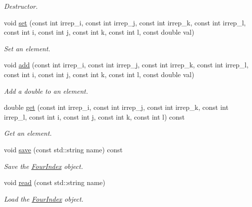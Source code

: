 \begin{DoxyCompactItemize}
\begin{DoxyCompactList}\small\item\em Destructor. \end{DoxyCompactList}\item 
void \hyperlink{classCheMPS2_1_1FourIndex_a8733c4fd0064bcd845786157f7d9b26f}{set} (const int irrep\-\_\-i, const int irrep\-\_\-j, const int irrep\-\_\-k, const int irrep\-\_\-l, const int i, const int j, const int k, const int l, const double val)
\begin{DoxyCompactList}\small\item\em Set an element. \end{DoxyCompactList}\item 
void \hyperlink{classCheMPS2_1_1FourIndex_a48e9e1b0939679da974e35c26281ba87}{add} (const int irrep\-\_\-i, const int irrep\-\_\-j, const int irrep\-\_\-k, const int irrep\-\_\-l, const int i, const int j, const int k, const int l, const double val)
\begin{DoxyCompactList}\small\item\em Add a double to an element. \end{DoxyCompactList}\item 
double \hyperlink{classCheMPS2_1_1FourIndex_ae93c264cbb81e7d39db778a129dc7ca1}{get} (const int irrep\-\_\-i, const int irrep\-\_\-j, const int irrep\-\_\-k, const int irrep\-\_\-l, const int i, const int j, const int k, const int l) const 
\begin{DoxyCompactList}\small\item\em Get an element. \end{DoxyCompactList}\item 
void \hyperlink{classCheMPS2_1_1FourIndex_a7d434479fe129f2c094c59f8a130361d}{save} (const std\-::string name) const 
\begin{DoxyCompactList}\small\item\em Save the \hyperlink{classCheMPS2_1_1FourIndex}{Four\-Index} object. \end{DoxyCompactList}\item 
void \hyperlink{classCheMPS2_1_1FourIndex_a557d6a17fa93c708a94fa5924626c405}{read} (const std\-::string name)
\begin{DoxyCompactList}\small\item\em Load the \hyperlink{classCheMPS2_1_1FourIndex}{Four\-Index} object. \end{DoxyCompactList}\end{DoxyCompactItemize}


